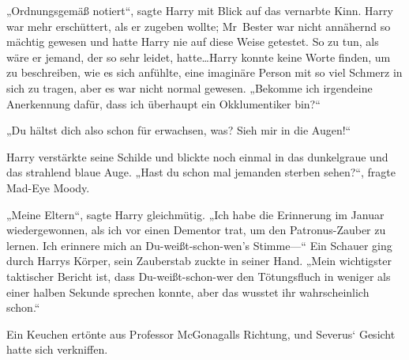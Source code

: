 „Ordnungsgemäß notiert“, sagte Harry mit Blick auf das vernarbte Kinn. Harry war mehr erschüttert, als er zugeben wollte; Mr~Bester war nicht annähernd so mächtig gewesen und hatte Harry nie auf diese Weise getestet. So zu tun, als wäre er jemand, der so sehr leidet, hatte…Harry konnte keine Worte finden, um zu beschreiben, wie es sich anfühlte, eine imaginäre Person mit so viel Schmerz in sich zu tragen, aber es war nicht normal gewesen.
„Bekomme ich irgendeine Anerkennung dafür, dass ich überhaupt ein Okklumentiker bin?“

„Du hältst dich also schon für erwachsen, was? Sieh mir in die Augen!“

Harry verstärkte seine Schilde und blickte noch einmal in das dunkelgraue und das strahlend blaue Auge. „Hast du schon mal jemanden sterben sehen?“, fragte Mad-Eye Moody.


„Meine Eltern“, sagte Harry gleichmütig. „Ich habe die Erinnerung im Januar wiedergewonnen, als ich vor einen Dementor trat, um den Patronus-Zauber zu lernen. Ich erinnere mich an Du-weißt-schon-wen’s Stimme—“ Ein Schauer ging durch Harrys Körper, sein Zauberstab zuckte in seiner Hand. „Mein wichtigster taktischer Bericht ist, dass Du-weißt-schon-wer den Tötungsfluch in weniger als einer halben Sekunde sprechen konnte, aber das wusstet ihr wahrscheinlich schon.“

Ein Keuchen ertönte aus Professor McGonagalls Richtung, und Severus‘ Gesicht hatte sich verkniffen.

